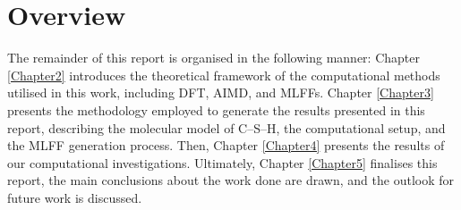 \section{Overview}
The remainder of this report is organised in the following manner: Chapter \ref{Chapter2} introduces the theoretical framework of the computational methods utilised in this work, including DFT, AIMD, and MLFFs. Chapter \ref{Chapter3} presents the methodology employed to generate the results presented in this report, describing the molecular model of C--S--H, the computational setup, and the MLFF generation process. Then, Chapter \ref{Chapter4} presents the results of our computational investigations. Ultimately, Chapter \ref{Chapter5} finalises this report, the main conclusions about the work done are drawn, and the outlook for future work is discussed.
